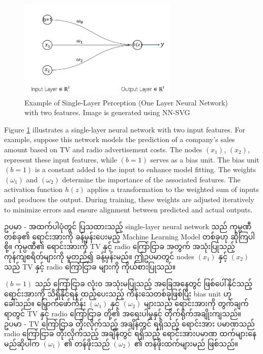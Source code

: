 \begin{figure}[h]%
\centering
\includegraphics[width=0.675\textwidth]{imgs/slp.png}
\caption{Example of Single-Layer Perception (One Layer Neural Network) with two features. Image is generated using NN-SVG\cite{web:NNSVG}}\label{fig:slp}
\end{figure}

Figure \ref{fig:slp} illustrates a single-layer neural network with two input features. For example, suppose this network models the prediction of a company's sales amount based on TV and radio advertisement costs. The nodes $( x_1 ) $, $( x_2)$, represent these input features, while $( b = 1) $ serves as a bias unit. The bias unit $( b=1) $ is a constant added to the input to enhance model fitting. The weights $(\omega_1)$ and $(\omega_2)$ determine the importance of the associated features. The activation function $h(z)$ applies a transformation to the weighted sum of inputs and produces the output. During training, these weights are adjusted iteratively to minimize errors and ensure alignment between predicted and actual outputs.  

\noindent ဥပမာ - အထက်ပါပုံတွင် ပြသထားသည့် single-layer neural network သည် ကုမ္ပဏီတစ်ခု၏ ရောင်းအားကို ခန့်မှန်းပေးမည့် Machine Learning Model တစ်ခုဟု ဆိုကြပါစို့။  ကုမ္ပဏီ၏ ရောင်းအားကို TV နှင့် radio ကြော်ငြာခ အတွက် အသုံးပြုသည့် ကုန်ကျစရိတ်များကို မူတည်၍ ခန့်မှန်းမည်။ ဤဥပမာတွင် nodes $( x_1 ) $ နှင့် $( x_2)$ သည် TV နှင့် radio ကြော်ငြာခ များကို ကိုယ်စားပြုသည်။  

$( b = 1) $ သည် ကြော်ငြာခ လုံး၀ အသုံးမပြုသည့် အခြေအနေတွင် ဖြစ်ပေါ်နိုင်သည့် ရောင်းအားကို သိရှိနိုင်ရန် ထည့်ပေးသည့် ကိန်းသေတစ်ခုဖြစ်ပြီး bias unit ဟု ခေါ်သည်။ မြှောက်ဖော်ကိန်း $(\omega_1)$ နှင့် $(\omega_2)$ များသည် ရောင်းအားကို တွက်ချက်ရာတွင် TV နှင့် radio ကြော်ငြာခ တို့၏ အရေးပါမှုနှင့် တိုက်ရိုက်အချိုးကျသည်။ ဥပမာ - TV ကြော်ငြာခ တိုးလိုက်သည့် အချိန်တွင် ရရှိသည့် ရောင်းအား ပမာဏသည် radio ကြော်ငြာခ တိုးလိုက်သည့် အချိန်တွင် ရရှိသည့် ရောင်းအားပမာဏ ထက်များနေမည်ဆိုပါက $(\omega_1)$ ၏ တန်ဖိုးသည် $(\omega_2)$ ၏ တန်ဖိုးထက်များမည် ဖြစ်သည်။ 

